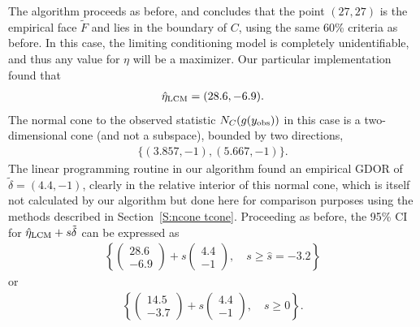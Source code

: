 The algorithm proceeds as before, and concludes that the 
point $(27,27)$ is the empirical face $\tilde{F}$ and lies in the boundary of $C$, using the
same 60\% criteria as before.
In this case, the limiting conditioning model is completely unidentifiable, and thus 
any value for $\eta$ will be a maximizer.  Our particular implementation found that
\begin{align*}
	\hat{\eta}_{\textrm{LCM}} = (28.6, -6.9 ).
\end{align*}
The normal cone to the observed statistic $N_C (g(y_{\text{obs}}) )$ in this case is a two-dimensional cone (and not a subspace), bounded by 
two directions,
\begin{align*}
	 \{ (3.857,   -1),	(5.667,   -1) \}.
\end{align*}
The linear programming routine in our algorithm found an empirical GDOR of 
$\tilde{\delta} = (4.4, -1)$, clearly 
in the relative interior of this normal cone, which is itself not calculated by
our algorithm but done here for comparison purposes using the methods described 
in Section~\ref{S:ncone tcone}.
Proceeding as before, the 95\% CI for $\hat{\eta}_{\textrm{LCM}} + s \tilde{\delta}$ can be expressed as
\begin{align*}
\left \{ \left(\begin{array}{r}28.6 \\-6.9\end{array}\right) + s \left(\begin{array}{r}4.4 \\-1\end{array}\right), 
\quad s \geq \hat{s} = -3.2 \right \}
\end{align*}
or 
\begin{align*}
\left \{ \left(\begin{array}{r}14.5 \\-3.7\end{array}\right) + s \left(\begin{array}{r}4.4 \\-1\end{array}\right), 
\quad s \geq 0 \right \}.
\end{align*}




